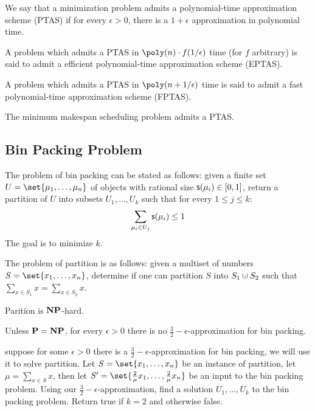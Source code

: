 \bdefn

    \benum
        \item We say that a minimization problem admits a {\emphcolor polynomial-time approximation scheme} (PTAS) if for every $\epsilon>0$, there is a $1+\epsilon$ approximation in polynomial time.
        \item A problem which admits a PTAS in $\poly(n)\cdot f(1/\epsilon)$ time (for $f$ arbitrary) is said to admit a {\emphcolor efficient polynomial-time approximation scheme} (EPTAS).
        \item A problem which admits a PTAS in $\poly(n+1/\epsilon)$ time is said to admit a {\emphcolor fast polynomial-time approximation scheme} (FPTAS).
    \eenum

\edefn

\bthrm

    The minimum makespan scheduling problem admits a PTAS.

\ethrm

\subsection{Bin Packing Problem}

\bdefn

    The problem of {\emphcolor bin packing} can be stated as follows: given a finite set $U=\set{\mu_1,\dots,\mu_n}$ of objects with rational size ${\sf s}(\mu_i)\in[0,1]$, return a partition of $U$ into
    subsets $U_1,\dots,U_k$ such that for every $1\leq j\leq k$:
    $$ \sum_{\mu_i\in U_j}{\sf s}(\mu_i) \leq 1 $$
    The goal is to minimize $k$.

\edefn

\bdefn

    The problem of {\emphcolor partition} is as follows: given a multiset of numbers $S=\set{x_1,\dots,x_n}$, determine if one can partition $S$ into $S_1\dcup S_2$ such that
    $\sum_{x\in S_1}x=\sum_{x\in S_2}x$.

\edefn

Parition is ${\bf NP}$-hard.

\bthrm

    Unless ${\bf P}={\bf NP}$, for every $\epsilon>0$ there is no $\frac32-\epsilon$-approximation for bin packing.

\ethrm

\Proof suppose for some $\epsilon>0$ there is a $\frac32-\epsilon$-approximation for bin packing, we will use it to solve partition.
Let $S=\set{x_1,\dots,x_n}$ be an instance of partition, let $\mu=\sum_{x\in S}x$, then let $S'=\set{\frac2\mu x_1,\dots,\frac2\mu x_n}$ be an input to the bin packing problem.
Using our $\frac32-\epsilon$-approximation, find a solution $U_1,\dots,U_k$ to the bin packing problem.
Return {\sf true} if $k=2$ and otherwise {\sf false}.

